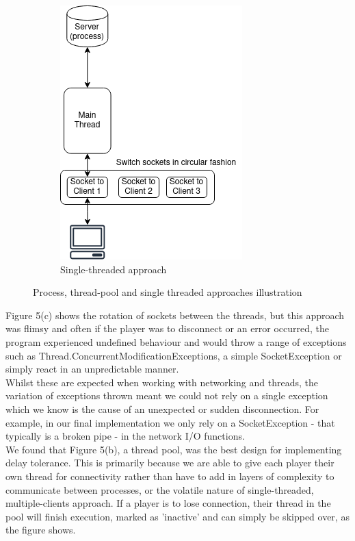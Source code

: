 \documentclass[11pt]{article}
\begin{document}
\begin{figure}[h]
{	\begin{subfigure}[h]{0.3\paperwidth}
	\hspace{10pt}
		\includegraphics[height=\fh]{approach_single}
		\caption{Single-threaded approach}
	\end{subfigure}	
	}
	
	\caption{Process, thread-pool and single threaded approaches illustration}
	
\end{figure}





Figure 5(c) shows the rotation of sockets between the threads, but this approach was flimsy and often if the player was to disconnect or an error occurred, the program experienced undefined behaviour and would throw a range of exceptions such as Thread.ConcurrentModificationExceptions, a simple SocketException or simply react in an unpredictable manner. \\

Whilst these are expected when working with networking and threads, the variation of exceptions thrown meant we could not rely on a single exception which we know is the cause of an unexpected or sudden disconnection. For example, in our final implementation we only rely on a SocketException - that typically is a broken pipe - in the network I/O functions. \\

We found that Figure 5(b), a thread pool, was the best design for implementing delay tolerance. This is primarily because we are able to give each player their own thread for connectivity rather than have to add in layers of complexity to communicate between processes, or the volatile nature of single-threaded, multiple-clients approach. If a player is to lose connection, their thread in the pool will finish execution, marked as 'inactive' and can simply be skipped over, as the figure shows. 
\end{document}
